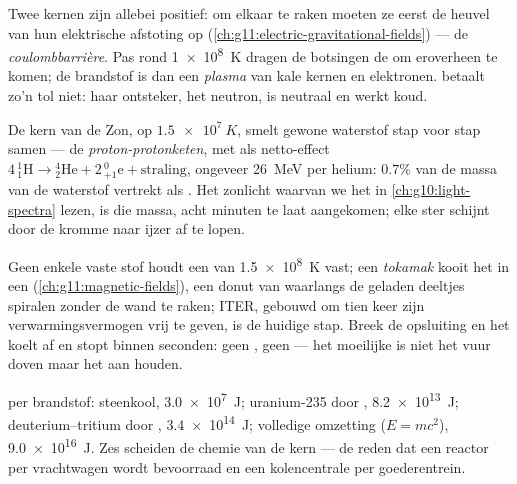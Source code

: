 \begin{definition}[De coulombbarrière]\label{def:g12:nuclear-energy:barrier}
Twee kernen zijn allebei positief: om elkaar te raken moeten ze eerst de
heuvel van hun elektrische afstoting op
(\cref{ch:g11:electric-gravitational-fields}) --- de
\emph{coulombbarrière}. Pas rond \qty{1e8}{K} dragen de
botsingen de  om eroverheen te komen; de brandstof is dan een
\emph{plasma} van kale kernen en elektronen. 
betaalt zo'n tol niet: haar ontsteker, het neutron, is neutraal en werkt koud.
\end{definition}

\begin{example}\label{ex:g12:nuclear-energy:sun}
De kern van de Zon, op $\qty{1.5e7}{K}$, smelt gewone waterstof stap voor stap
samen --- de \emph{proton-protonketen}, met als netto-effect
$4\,{}^{1}_{1}\mathrm{H} \to {}^{4}_{2}\mathrm{He} + 2\,{}^{0}_{+1}\mathrm{e}
+ \text{straling}$, ongeveer \qty{26}{MeV} per helium: $0.7\%$ van de massa
van de waterstof vertrekt als . Het zonlicht waarvan we het  in
\cref{ch:g10:light-spectra} lezen, is die massa, acht minuten te laat
aangekomen; elke ster schijnt door de kromme naar ijzer af te lopen.
\end{example}

\begin{remark}\label{rem:g12:nuclear-energy:iter}
Geen enkele vaste stof houdt een  van \qty{1.5e8}{K} vast; een
\emph{tokamak} kooit het in een 
(\cref{ch:g11:magnetic-fields}), een donut van  waarlangs de geladen
deeltjes spiralen zonder de wand te raken; ITER, gebouwd om tien keer zijn
verwarmingsvermogen vrij te geven, is de huidige stap. Breek de opsluiting en
het  koelt af en stopt binnen seconden: geen , geen
 --- het moeilijke is niet het vuur doven maar het aan houden.
\end{remark}

\begin{example}\label{ex:g12:nuclear-energy:ladder}
 per  brandstof: steenkool, \qty{3.0e7}{J}; uranium-235 door
, \qty{8.2e13}{J}; deuterium--tritium door ,
\qty{3.4e14}{J}; volledige omzetting ($E = mc^2$), \qty{9.0e16}{J}. Zes
 scheiden de chemie van de kern --- de reden dat een reactor per
vrachtwagen wordt bevoorraad en een kolencentrale per goederentrein.
\end{example}

